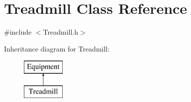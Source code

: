 \hypertarget{class_treadmill}{}\section{Treadmill Class Reference}
\label{class_treadmill}


{\ttfamily \#include $<$Treadmill.\+h$>$}

Inheritance diagram for Treadmill\+:\begin{figure}[H]
\begin{center}
\leavevmode
\includegraphics[height=2.000000cm]{class_treadmill}
\end{center}
\end{figure}
